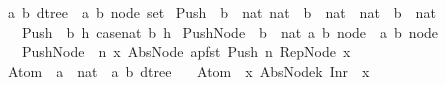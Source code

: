 \begin{isabellebody}
\isamarkupfalse%
\ {\isacharparenleft}{\isacharprime}a{\isacharcomma}\ {\isacharprime}b{\isacharparenright}\ dtree\ {\isacharequal}\ {\isachardoublequoteopen}{\isacharparenleft}{\isacharprime}a{\isacharcomma}\ {\isacharprime}b{\isacharparenright}\ node\ set{\isachardoublequoteclose}\isanewline
\isanewline
{}\isamarkupfalse%
\ Push\ {\isacharcolon}{\isacharcolon}\ {\isachardoublequoteopen}{\isacharbrackleft}{\isacharparenleft}{\isacharprime}b\ {\isacharplus}\ nat{\isacharparenright}{\isacharcomma}\ nat\ {\isacharequal}{\isachargreater}\ {\isacharparenleft}{\isacharprime}b\ {\isacharplus}\ nat{\isacharparenright}{\isacharbrackright}\ {\isacharequal}{\isachargreater}\ {\isacharparenleft}nat\ {\isacharequal}{\isachargreater}\ {\isacharparenleft}{\isacharprime}b\ {\isacharplus}\ nat{\isacharparenright}{\isacharparenright}{\isachardoublequoteclose}\isanewline
\ \ \isanewline
\ \ \ {\isachardoublequoteopen}Push\ {\isacharequal}{\isacharequal}\ {\isacharparenleft}{\isacharpercent}b\ h{\isachardot}\ case{\isacharunderscore}nat\ b\ h{\isacharparenright}{\isachardoublequoteclose}\isanewline
\isanewline
{}\isamarkupfalse%
\ Push{\isacharunderscore}Node\ {\isacharcolon}{\isacharcolon}\ {\isachardoublequoteopen}{\isacharbrackleft}{\isacharparenleft}{\isacharprime}b\ {\isacharplus}\ nat{\isacharparenright}{\isacharcomma}\ {\isacharparenleft}{\isacharprime}a{\isacharcomma}\ {\isacharprime}b{\isacharparenright}\ node{\isacharbrackright}\ {\isacharequal}{\isachargreater}\ {\isacharparenleft}{\isacharprime}a{\isacharcomma}\ {\isacharprime}b{\isacharparenright}\ node{\isachardoublequoteclose}\isanewline
\ \ \ {\isachardoublequoteopen}Push{\isacharunderscore}Node\ {\isacharequal}{\isacharequal}\ {\isacharparenleft}{\isacharpercent}n\ x{\isachardot}\ Abs{\isacharunderscore}Node\ {\isacharparenleft}apfst\ {\isacharparenleft}Push\ n{\isacharparenright}\ {\isacharparenleft}Rep{\isacharunderscore}Node\ x{\isacharparenright}{\isacharparenright}{\isacharparenright}{\isachardoublequoteclose}\isanewline
\isanewline
\isanewline
\isanewline
\isanewline
\isanewline
{}\isamarkupfalse%
\ Atom\ {\isacharcolon}{\isacharcolon}\ {\isachardoublequoteopen}{\isacharparenleft}{\isacharprime}a\ {\isacharplus}\ nat{\isacharparenright}\ {\isacharequal}{\isachargreater}\ {\isacharparenleft}{\isacharprime}a{\isacharcomma}\ {\isacharprime}b{\isacharparenright}\ dtree{\isachardoublequoteclose}\isanewline
\ \ \ {\isachardoublequoteopen}Atom\ {\isacharequal}{\isacharequal}\ {\isacharparenleft}{\isacharpercent}x{\isachardot}\ {\isacharbraceleft}Abs{\isacharunderscore}Node{\isacharparenleft}{\isacharparenleft}{\isacharpercent}k{\isachardot}\ Inr\ {}{\isacharcomma}\ x{\isacharparenright}{\isacharparenright}{\isacharbraceright}{\isacharparenright}{\isachardoublequoteclose}\isanewline

\end{isabellebody}
